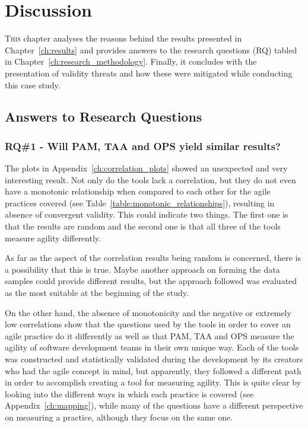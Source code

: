 \chapter{Discussion}
\label{ch:discussion}
\lettrine[lines=4, loversize=-0.1, lraise=0.1]{T}{his} chapter analyses the reasons behind the results presented in Chapter~\ref{ch:results} and provides answers to the research questions (RQ) tabled in Chapter~\ref{ch:research_methodology}. Finally, it concludes with the presentation of validity threats and how these were mitigated while conducting this case study.

\section{Answers to Research Questions}

\subsection{RQ\#1 - Will \ac{PAM}, \ac{TAA} and \ac{OPS} yield similar results?}

The plots in Appendix~\ref{ch:correlation_plots} showed an unexpected and very interesting result. Not only do the tools lack a correlation, but they do not even have a monotonic relationship when compared to each other for the agile practices covered (see Table~\ref{table:monotonic_relationships}), resulting in absence of convergent validity. This could indicate two things. The first one is that the results are random and the second one is that all three of the tools measure agility differently. 

As far as the aspect of the correlation results being random is concerned, there is a possibility that this is true. Maybe another approach on forming the data samples could provide different results, but the approach followed was evaluated as the most suitable at the beginning of the study.

On the other hand, the absence of monotonicity and the negative or extremely low correlations show that the questions used by the tools in order to cover an agile practice do it differently as well as that \ac{PAM}, \ac{TAA} and \ac{OPS} measure the agility of software development teams in their own unique way. Each of the tools was constructed and statistically validated during the development by its creators who had the agile concept in mind, but apparently, they followed a different path in order to accomplish creating a tool for measuring agility. This is quite clear by looking into the different ways in which each practice is covered (see Appendix~\ref{ch:mapping}), while many of the questions have a different perspective on measuring a practice, although they focus on the same one. 

